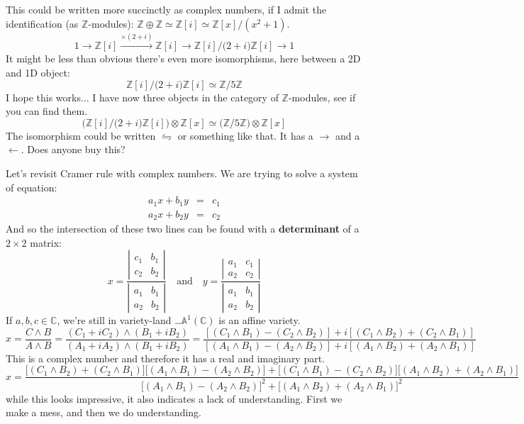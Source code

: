 \documentclass[12pt]{article}
\begin{document}
This could be written more succinctly as complex numbers, if I admit the identification (as $\mathbb{Z}$-modules): $ \mathbb{Z} \oplus \mathbb{Z} \simeq \mathbb{Z}[i] \simeq \mathbb{Z}[x]/(x^2 +1)$.
$$ 1 \longrightarrow \mathbb{Z}[i]  \stackrel{ \times (2+i)}{\longrightarrow}  \mathbb{Z}[i]  \longrightarrow \mathbb{Z}[i]/\big(2+i\big)\mathbb{Z}[i] \longrightarrow 1$$
It might be less than obvious there's even more isomorphisms, here between a 2D and 1D object:
$$ \mathbb{Z}[i]/\big(2+i\big)\mathbb{Z}[i] \simeq \mathbb{Z}/5\mathbb{Z} $$
I hope this works... I have now three objects in the category of $\mathbb{Z}$-modules, see if you can find them.
$$ \big( \mathbb{Z}[i]/\big(2+i\big)\mathbb{Z}[i] \big)\otimes \mathbb{Z}[x] \simeq \big(\mathbb{Z}/5\mathbb{Z} \big)\otimes \mathbb{Z}[x] $$
The isomorphism could be written $\leftrightharpoons$ or something like that.  It has a $\rightarrow$ and a $\leftarrow$.  Does anyone buy this?

\newpage

\noindent Let's revisit Cramer rule with complex numbers.  We are trying to solve a system of equation:
\begin{eqnarray*}
a_1 x + b_1 y &=& c_1 \\
a_2 x + b_2 y &=& c_2
\end{eqnarray*}
And so the intersection of these two lines can be found with a \textbf{determinant} of a $2 \times 2$ matrix:
$$ x = \frac{\left|\begin{array}{cc} c_1 & b_1 \\ c_2 & b_2 \end{array} \right|}{\left|\begin{array}{cc} a_1 & b_1 \\ a_2 & b_2 \end{array} \right|} \quad\text{and}\quad 
y = \frac{\left|\begin{array}{cc} a_1 & c_1 \\ a_2 & c_2 \end{array} \right|}{\left|\begin{array}{cc} a_1 & b_1 \\ a_2 & b_2 \end{array} \right|} $$
If $a,b,c \in \mathbb{C}$, we're still in variety-land \dots $\mathbb{A}^1(\mathbb{C})$ is an affine variety.
$$ x = \frac{C \wedge B}{A \wedge B} = \frac{(C_1 + i C_2)\wedge (B_1 + i B_2)}{(A_1 + i A_2)\wedge (B_1 + i B_2)} 
= \frac{[(C_1 \wedge B_1) - (C_2 \wedge B_2)] + i [
(C_1 \wedge B_2)+ (C_2 \wedge B_1)]}{
[(A_1 \wedge B_1)- (A_2 \wedge B_2)] + i [(A_1 \wedge B_2)+ (A_2 \wedge B_1)]}$$
This is a complex number and therefore it has a real and imaginary part.
$$ x = \frac{
\big[ (C_1 \wedge B_2)+ (C_2 \wedge B_1)\big]\big[(A_1 \wedge B_1)- (A_2 \wedge B_2)\big]
+ 
\big[(C_1 \wedge B_1) - (C_2 \wedge B_2)\big]\big[(A_1 \wedge B_2)+ (A_2 \wedge B_1)\big]
}{
\big[(A_1 \wedge B_1)- (A_2 \wedge B_2)\big]^2 +  \big[(A_1 \wedge B_2)+ (A_2 \wedge B_1)\big]^2} $$
while this looks impressive, it also indicates a lack of understanding.  First we make a mess, and then we do understanding.
\vfill
\end{document}

